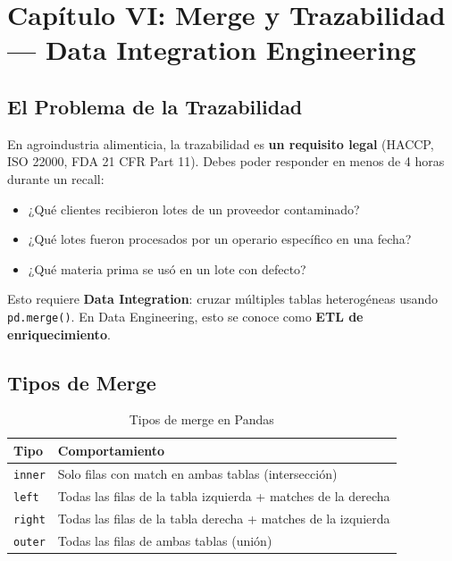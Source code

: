 \documentclass[11pt, a4paper]{article}
\begin{document}
\newpage

\section{Capítulo VI: Merge y Trazabilidad — Data Integration Engineering}

\subsection{El Problema de la Trazabilidad}

En agroindustria alimenticia, la trazabilidad es \textbf{un requisito legal} (HACCP, ISO 22000, FDA 21 CFR Part 11). Debes poder responder en menos de 4 horas durante un recall:

\begin{itemize}
    \item ¿Qué clientes recibieron lotes de un proveedor contaminado?
    \item ¿Qué lotes fueron procesados por un operario específico en una fecha?
    \item ¿Qué materia prima se usó en un lote con defecto?
\end{itemize}

Esto requiere \textbf{Data Integration}: cruzar múltiples tablas heterogéneas usando \texttt{pd.merge()}. En Data Engineering, esto se conoce como \textbf{ETL de enriquecimiento}.

\subsection{Tipos de Merge}

\begin{table}[h]
\centering
\begin{tabular}{@{}lp{8cm}@{}}
\toprule
\textbf{Tipo} & \textbf{Comportamiento} \\
\midrule
\texttt{inner} & Solo filas con match en ambas tablas (intersección) \\
\texttt{left} & Todas las filas de la tabla izquierda + matches de la derecha \\
\texttt{right} & Todas las filas de la tabla derecha + matches de la izquierda \\
\texttt{outer} & Todas las filas de ambas tablas (unión) \\
\bottomrule
\end{tabular}
\caption{Tipos de merge en Pandas}
\end{table}
\end{document}
